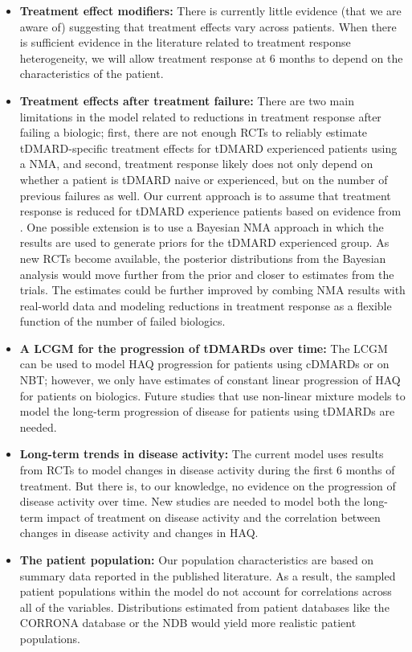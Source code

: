 \documentclass[11pt,final,fleqn]{article}
\theoremstyle{plain}
\begin{document}
\begin{itemize}
\item \textbf{Treatment effect modifiers:} There is currently little evidence (that we are aware of) suggesting that treatment effects vary across patients. When there is sufficient evidence in the literature related to treatment response heterogeneity, we will allow treatment response at 6 months to depend on the characteristics of the patient.  
\item \textbf{Treatment effects after treatment failure:} There are two main limitations in the model related to reductions in treatment response after failing a biologic; first, there are not enough RCTs to reliably estimate tDMARD-specific treatment effects for tDMARD experienced patients using a NMA, and second, treatment response likely does not only depend on whether a patient is tDMARD naive or experienced, but on the number of previous failures as well. Our current approach is to assume that treatment response is reduced for tDMARD experience patients based on evidence from \citet{carlson2015economic}. One possible extension is to use a Bayesian NMA approach in which the \citet{carlson2015economic} results are used to generate priors for the tDMARD experienced group. As new RCTs become available, the posterior distributions from the Bayesian analysis would move further from the prior and closer to estimates from the trials. The estimates could be further improved by combing NMA results with real-world data and modeling reductions in treatment response as a flexible function of the number of failed biologics. 
\item \textbf{A LCGM for the progression of tDMARDs over time:} The LCGM can be used to model HAQ progression for patients using cDMARDs or on NBT; however, we only have estimates of constant linear progression of HAQ for patients on biologics. Future studies that use non-linear mixture models to model the long-term progression of disease for patients using tDMARDs are needed. 
\item \textbf{Long-term trends in disease activity:} The current model uses results from RCTs to model changes in disease activity during the first 6 months of treatment. But there is, to our knowledge, no evidence on the progression of disease activity over time. New studies are needed to model both the long-term impact of treatment on disease activity and the correlation between changes in disease activity and changes in HAQ.
\item \textbf{The patient population:} Our population characteristics are based on summary data reported in the published literature. As a result, the sampled patient populations within the model do not account for correlations across all of the variables. Distributions estimated from patient databases like the CORRONA database or the NDB would yield more realistic patient populations. 

\end{itemize}
\end{document}
